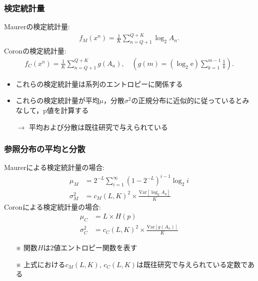\documentclass[dvipdfmx,11pt]{beamer}
\begin{document}
\begin{frame}[t]\frametitle{検定統計量}
Maurerの検定統計量:
\begin{align*}
  f_M(x^n) = \frac{1}{K}\sum_{n=Q+1}^{Q+K} \log_2 A_n.
\end{align*}
Coronの検定統計量:
\begin{align*}
  f_C(x^n) = \frac{1}{K}\sum_{n=Q+1}^{Q+K} g(A_n), \quad \left( g(m) = (\log_2\mathrm{e}) \sum_{k=1}^{m-1}\frac{1}{k} \right).
\end{align*}
%
\vspace{\baselineskip}
\begin{itemize}\setlength{\itemsep}{0.5\baselineskip}
  \item これらの検定統計量は系列のエントロピーに関係する
  \item これらの検定統計量が平均$\mu$，分散$\sigma^2$の正規分布に近似的に従っているとみなして，p値を計算する
  \item[$\to$] 平均および分散は既往研究で与えられている
\end{itemize}
\end{frame}
\begin{frame}[c]\frametitle{参照分布の平均と分散}
Maurerによる検定統計量の場合:
\begin{align*}
  \mu_M &= 2^{-L}\sum_{i=1}^{\infty}(1-2^{-L})^{i-1} \log_2 i \\
  \sigma_M^2 &= c_M(L,K)^2 \times \frac{\mathrm{Var}[\log_2 A_n]}{K}
\end{align*}
%
Coronによる検定統計量の場合:
\begin{align*}
  \mu_C &= L\times H(p)\\
  \sigma_C^2 &= c_C(L,K)^2 \times \frac{\mathrm{Var}[g(A_n)]}{K}
\end{align*}
%
\begin{itemize}
  \item[※] 関数$H$は2値エントロピー関数を表す
  \item[※] 上式における$c_M(L,K),\,c_C(L,K)$は既往研究で与えられている定数である 
\end{itemize}
\end{frame}
\end{document}
